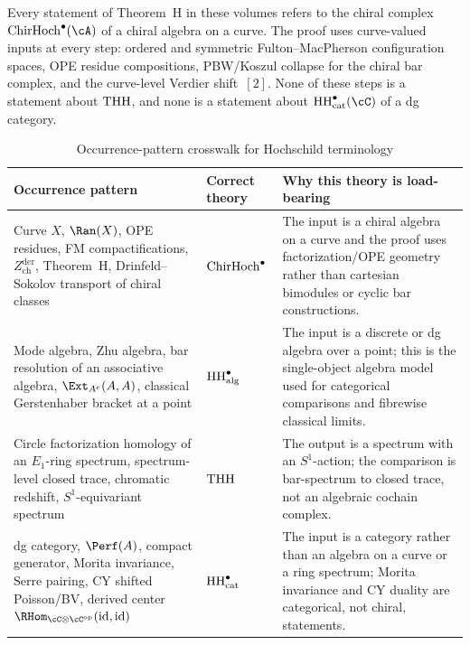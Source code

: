 \begin{remark}
\label{rem:theorem-h-chiral-only}
Every statement of Theorem~H in these volumes refers to the chiral
 complex $\ChirHoch^\bullet(\cA)$ of a chiral algebra on a curve.
 The proof uses curve-valued inputs at every step: ordered and
 symmetric Fulton--MacPherson configuration spaces, OPE residue
 compositions, PBW/Koszul collapse for the chiral bar complex,
 and the curve-level Verdier shift~$[2]$. None of these steps is a
 statement about $\mathrm{THH}$, and none is a statement about
 $\HHcat^\bullet(\cC)$ of a dg category.
\end{remark}

\begin{table}[ht]
\centering
\caption{Occurrence-pattern crosswalk for Hochschild terminology}
\label{tab:hochschild-occurrence-crosswalk}
\renewcommand{\arraystretch}{1.2}
\begin{tabular}{p{4.2cm}p{3.2cm}p{6.2cm}}
\toprule
\textbf{Occurrence pattern} & \textbf{Correct theory} &
\textbf{Why this theory is load-bearing} \\
\midrule
Curve $X$, $\Ran(X)$, OPE residues, FM compactifications,
$Z^{\mathrm{der}}_{\mathrm{ch}}$, Theorem~H,
Drinfeld--Sokolov transport of chiral classes &
$\mathrm{ChirHoch}^\bullet$ &
The input is a chiral algebra on a curve and the proof uses
factorization/OPE geometry rather than cartesian bimodules or cyclic
bar constructions. \\
\addlinespace
Mode algebra, Zhu algebra, bar resolution of an associative algebra,
$\Ext_{A^e}(A,A)$, classical Gerstenhaber bracket at a point &
$\mathrm{HH}_{\mathrm{alg}}^\bullet$ &
The input is a discrete or dg algebra over a point; this is the
single-object algebra model used for categorical comparisons and
fibrewise classical limits. \\
\addlinespace
Circle factorization homology of an $E_1$-ring spectrum,
spectrum-level closed trace, chromatic redshift, $S^1$-equivariant
spectrum &
$\mathrm{THH}$ &
The output is a spectrum with an $S^1$-action; the comparison is
bar-spectrum to closed trace, not an algebraic cochain complex. \\
\addlinespace
dg category, $\Perf(A)$, compact generator, Morita invariance, Serre
pairing, CY shifted Poisson/BV, derived center
$\RHom_{\cC \otimes \cC^{\mathrm{op}}}(\id,\id)$ &
$\mathrm{HH}_{\mathrm{cat}}^\bullet$ &
The input is a category rather than an algebra on a curve or a ring
spectrum; Morita invariance and CY duality are categorical, not
chiral, statements. \\
\bottomrule
\end{tabular}
\end{table}
